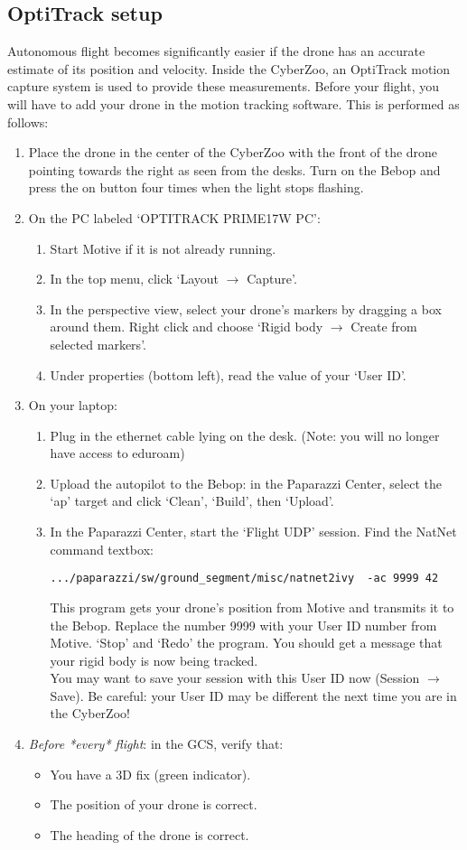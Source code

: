 \documentclass{article}
\begin{document}
\subsection*{OptiTrack setup}
Autonomous flight becomes significantly easier if the drone has an accurate estimate of its position and velocity. Inside the CyberZoo, an OptiTrack motion capture system is used to provide these measurements. Before your flight, you will have to add your drone in the motion tracking software. This is performed as follows:
\begin{enumerate}
\item Place the drone in the center of the CyberZoo with the front of the drone pointing towards the right as seen from the desks. Turn on the Bebop and press the on button four times when the light stops flashing. 
\item On the PC labeled `OPTITRACK PRIME17W PC':
\begin{enumerate}
\item Start Motive if it is not already running.
\item In the top menu, click `Layout $\rightarrow$ Capture'.
\item In the perspective view, select your drone's markers by dragging a box around them. Right click and choose `Rigid body $\rightarrow$ Create from selected markers'.
\item Under properties (bottom left), read the value of your `User ID'.
\end{enumerate}
\item On your laptop:
\begin{enumerate}
\item Plug in the ethernet cable lying on the desk. (Note: you will no longer have access to eduroam)
\item Upload the autopilot to the Bebop: in the Paparazzi Center, select the `ap' target and click `Clean', `Build', then `Upload'.
\item In the Paparazzi Center, start the `Flight UDP' session. Find the NatNet command textbox:
\begin{verbatim}
.../paparazzi/sw/ground_segment/misc/natnet2ivy  -ac 9999 42
\end{verbatim}
This program gets your drone's position from Motive and transmits it to the Bebop. Replace the number 9999 with your User ID number from Motive. `Stop' and `Redo' the program. You should get a message that your rigid body is now being tracked.\\
You may want to save your session with this User ID now (Session $\rightarrow$ Save). Be careful: your User ID may be different the next time you are in the CyberZoo!
\end{enumerate}
\item \emph{Before *every* flight}: in the GCS, verify that:
\begin{itemize}
\item You have a 3D fix (green indicator).
\item The position of your drone is correct.
\item The heading of the drone is correct.
\end{itemize}
\end{enumerate}
\end{document}
